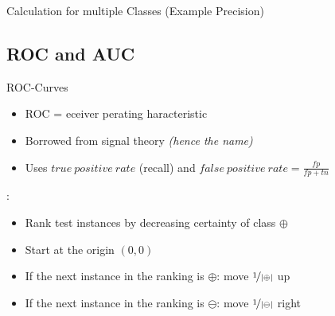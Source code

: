 \begin{frame}{Calculation for multiple Classes (Example Precision)}{}
\end{frame}


\subsection{ROC and AUC}

\begin{frame}{ROC-Curves}{}
	\begin{itemize}
		\item ROC = eceiver perating haracteristic
		\item Borrowed from signal theory {\footnotesize \textit{(hence the name)}}
		\item Uses $true\ positive\ rate$ (recall) and $false\ positive\ rate = \frac{fp}{fp + tn}$
	\end{itemize}
	
	\begin{boxBlueNoFrame}
		:
		\footnotesize
		\begin{itemize}\setlength\itemsep{-0.25em}
			\item Rank test instances by decreasing certainty of class $\bm{\oplus}$
			\item Start at the origin $(0, 0)$
			\item If the next instance in the ranking is $\oplus$: move $\nicefrac{1}{\vert \oplus \vert}$ up
			\item If the next instance in the ranking is $\ominus$: move $\nicefrac{1}{\vert \ominus \vert}$ right
		\end{itemize}
	\end{boxBlueNoFrame}
\end{frame}


